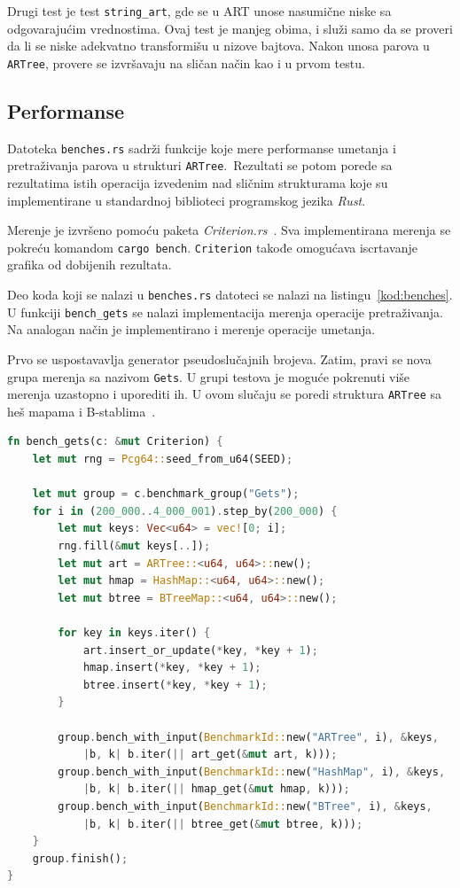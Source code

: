 \documentclass[12pt,oneside]{memoir}
\begin{document}
Drugi test je test \texttt{string\_art},
gde se u ART unose nasumične niske sa odgovarajućim vrednostima.
Ovaj test je manjeg obima, i služi samo da se proveri da li se niske
adekvatno transformišu u nizove bajtova. Nakon unosa parova u \texttt{ARTree},
provere se izvršavaju na sličan način kao i u prvom testu.

\subsection{Performanse}

Datoteka \texttt{benches.rs} sadrži funkcije koje mere
performanse umetanja i pretraživanja parova u
strukturi \texttt{ARTree}.\
Rezultati se potom porede sa rezultatima istih operacija
izvedenim nad sličnim strukturama koje su implementirane u standardnoj
biblioteci programskog jezika \textit{Rust}.

Merenje je izvršeno pomoću paketa \textit{Criterion.rs}~\cite{criterion}.
Sva implementirana merenja se pokreću komandom \texttt{cargo bench}.
\texttt{Criterion} takođe
omogućava iscrtavanje grafika od dobijenih rezultata.

Deo koda koji se nalazi u \texttt{benches.rs} datoteci se nalazi na
listingu~\ref{kod:benches}. U funkciji \texttt{bench\_gets} se nalazi
implementacija merenja operacije pretraživanja.
Na analogan način je implementirano i merenje operacije umetanja.

Prvo se uspostavavlja generator pseudoslučajnih brojeva. Zatim,
pravi se nova grupa merenja sa nazivom \texttt{Gets}. U grupi testova
je moguće pokrenuti više merenja uzastopno i uporediti ih.
U ovom slučaju se poredi struktura \texttt{ARTree} sa heš mapama i
B-stablima~\cite{btree}.

\begin{lstlisting}[language=Rust,
                   caption={Funkcija \texttt{bench\_gets}},
                   label={kod:benches}]
fn bench_gets(c: &mut Criterion) {
    let mut rng = Pcg64::seed_from_u64(SEED);

    let mut group = c.benchmark_group("Gets");
    for i in (200_000..4_000_001).step_by(200_000) {
        let mut keys: Vec<u64> = vec![0; i];
        rng.fill(&mut keys[..]);
        let mut art = ARTree::<u64, u64>::new();
        let mut hmap = HashMap::<u64, u64>::new();
        let mut btree = BTreeMap::<u64, u64>::new();

        for key in keys.iter() {
            art.insert_or_update(*key, *key + 1);
            hmap.insert(*key, *key + 1);
            btree.insert(*key, *key + 1);
        }

        group.bench_with_input(BenchmarkId::new("ARTree", i), &keys,
            |b, k| b.iter(|| art_get(&mut art, k)));
        group.bench_with_input(BenchmarkId::new("HashMap", i), &keys,
            |b, k| b.iter(|| hmap_get(&mut hmap, k)));
        group.bench_with_input(BenchmarkId::new("BTree", i), &keys,
            |b, k| b.iter(|| btree_get(&mut btree, k)));
    }
    group.finish();
}

\end{lstlisting}
\end{document}
